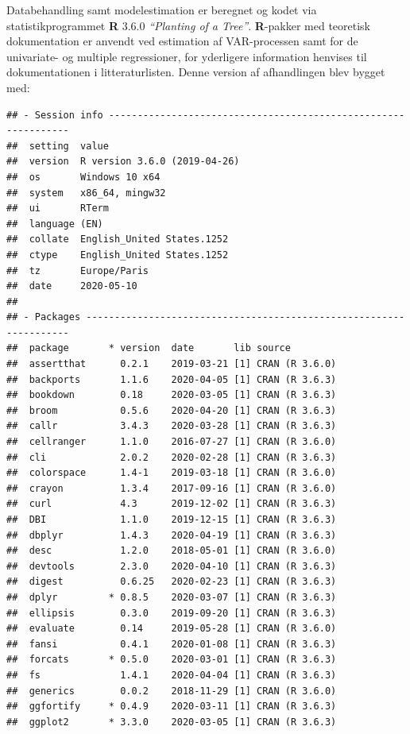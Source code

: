 \documentclass[
  a4paper,
  oneside]{memoir}
\begin{document}
Databehandling samt modelestimation er beregnet og kodet via statistikprogrammet \textbf{R} 3.6.0 \emph{``Planting of a Tree''}. \textbf{R}-pakker med teoretisk dokumentation er anvendt ved estimation af VAR-processen samt for de univariate- og multiple regressioner, for yderligere information henvises til dokumentationen i litteraturlisten. Denne version af afhandlingen blev bygget med:

\begin{verbatim}
## - Session info ---------------------------------------------------------------
##  setting  value                       
##  version  R version 3.6.0 (2019-04-26)
##  os       Windows 10 x64              
##  system   x86_64, mingw32             
##  ui       RTerm                       
##  language (EN)                        
##  collate  English_United States.1252  
##  ctype    English_United States.1252  
##  tz       Europe/Paris                
##  date     2020-05-10                  
## 
## - Packages -------------------------------------------------------------------
##  package       * version  date       lib source           
##  assertthat      0.2.1    2019-03-21 [1] CRAN (R 3.6.0)   
##  backports       1.1.6    2020-04-05 [1] CRAN (R 3.6.3)   
##  bookdown        0.18     2020-03-05 [1] CRAN (R 3.6.3)   
##  broom           0.5.6    2020-04-20 [1] CRAN (R 3.6.3)   
##  callr           3.4.3    2020-03-28 [1] CRAN (R 3.6.3)   
##  cellranger      1.1.0    2016-07-27 [1] CRAN (R 3.6.0)   
##  cli             2.0.2    2020-02-28 [1] CRAN (R 3.6.3)   
##  colorspace      1.4-1    2019-03-18 [1] CRAN (R 3.6.0)   
##  crayon          1.3.4    2017-09-16 [1] CRAN (R 3.6.0)   
##  curl            4.3      2019-12-02 [1] CRAN (R 3.6.3)   
##  DBI             1.1.0    2019-12-15 [1] CRAN (R 3.6.3)   
##  dbplyr          1.4.3    2020-04-19 [1] CRAN (R 3.6.3)   
##  desc            1.2.0    2018-05-01 [1] CRAN (R 3.6.0)   
##  devtools        2.3.0    2020-04-10 [1] CRAN (R 3.6.3)   
##  digest          0.6.25   2020-02-23 [1] CRAN (R 3.6.3)   
##  dplyr         * 0.8.5    2020-03-07 [1] CRAN (R 3.6.3)   
##  ellipsis        0.3.0    2019-09-20 [1] CRAN (R 3.6.3)   
##  evaluate        0.14     2019-05-28 [1] CRAN (R 3.6.0)   
##  fansi           0.4.1    2020-01-08 [1] CRAN (R 3.6.3)   
##  forcats       * 0.5.0    2020-03-01 [1] CRAN (R 3.6.3)   
##  fs              1.4.1    2020-04-04 [1] CRAN (R 3.6.3)   
##  generics        0.0.2    2018-11-29 [1] CRAN (R 3.6.0)   
##  ggfortify     * 0.4.9    2020-03-11 [1] CRAN (R 3.6.3)   
##  ggplot2       * 3.3.0    2020-03-05 [1] CRAN (R 3.6.3)   

\end{verbatim}
\end{document}
